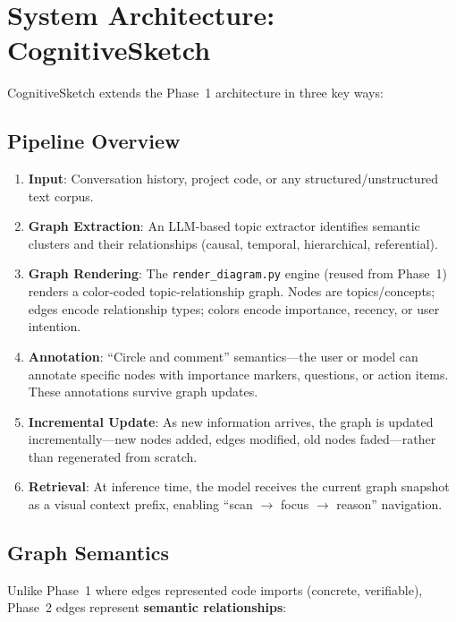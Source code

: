 \documentclass[11pt,a4paper]{article}
\begin{document}
\section{System Architecture: CognitiveSketch}

CognitiveSketch extends the Phase~1 architecture in three key ways:

\subsection{Pipeline Overview}

\begin{enumerate}[nosep]
\item \textbf{Input}: Conversation history, project code, or any structured/unstructured text corpus.
\item \textbf{Graph Extraction}: An LLM-based topic extractor identifies semantic clusters and their relationships (causal, temporal, hierarchical, referential).
\item \textbf{Graph Rendering}: The \texttt{render\_diagram.py} engine (reused from Phase~1) renders a color-coded topic-relationship graph. Nodes are topics/concepts; edges encode relationship types; colors encode importance, recency, or user intention.
\item \textbf{Annotation}: ``Circle and comment'' semantics---the user or model can annotate specific nodes with importance markers, questions, or action items. These annotations survive graph updates.
\item \textbf{Incremental Update}: As new information arrives, the graph is updated incrementally---new nodes added, edges modified, old nodes faded---rather than regenerated from scratch.
\item \textbf{Retrieval}: At inference time, the model receives the current graph snapshot as a visual context prefix, enabling ``scan $\rightarrow$ focus $\rightarrow$ reason'' navigation.
\end{enumerate}

\subsection{Graph Semantics}

Unlike Phase~1 where edges represented code imports (concrete, verifiable), Phase~2 edges represent \textbf{semantic relationships}:
\end{document}
